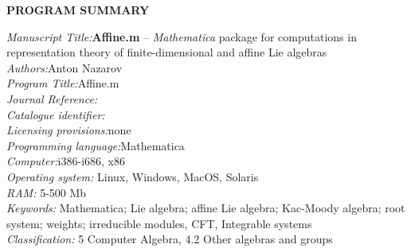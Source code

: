 

{\bf PROGRAM SUMMARY}%

\begin{small}
\noindent
{\em Manuscript Title:}{\bf Affine.m} -- {\it Mathematica} package for computations in representation theory of finite-dimensional and affine Lie algebras                                       \\
{\em Authors:}Anton Nazarov                                                \\
{\em Program Title:}Affine.m                                          \\
{\em Journal Reference:}                                      \\
{\em Catalogue identifier:}                                   \\
{\em Licensing provisions:}none                                   \\
{\em Programming language:}Mathematica                                   \\
{\em Computer:}i386-i686, x86                                               \\
{\em Operating system:} Linux, Windows, MacOS, Solaris                                       \\
{\em RAM:} 5-500 Mb                                              \\
{\em Keywords:} Mathematica; Lie algebra; affine Lie algebra; Kac-Moody algebra; root system; weights; irreducible modules, CFT, Integrable systems\\
{\em Classification:} 5 Computer Algebra, 4.2 Other algebras and groups                                         \\

\end{small}
